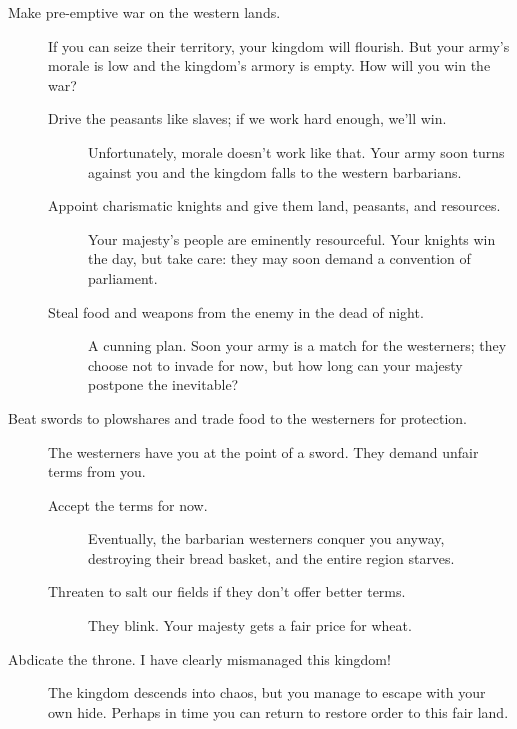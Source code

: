\documentclass{book}
\begin{document}
\begin{description}
\item[Make pre-emptive war on the western lands.]
If
you
can
seize
their
territory,
your
kingdom
will
flourish.
But
your
army's
morale
is
low
and
the
kingdom's
armory
is
empty.
How
will
you
win
the
war?
\begin{description}
\item[Drive the peasants like slaves; if we work hard enough, we'll win.]
Unfortunately,
morale
doesn't
work
like
that.
Your
army
soon
turns
against
you
and
the
kingdom
falls
to
the
western
barbarians.
\item[Appoint charismatic knights and give them land, peasants, and resources.]
Your
majesty's
people
are
eminently
resourceful.
Your
knights
win
the
day,
but
take
care:
they
may
soon
demand
a
convention
of
parliament.
\item[Steal food and weapons from the enemy in the dead of night.]
A
cunning
plan.
Soon
your
army
is
a
match
for
the
westerners;
they
choose
not
to
invade
for
now,
but
how
long
can
your
majesty
postpone
the
inevitable?
\end{description}
\item[Beat swords to plowshares and trade food to the westerners for protection.]
The
westerners
have
you
at
the
point
of
a
sword.
They
demand
unfair
terms
from
you.
\begin{description}
\item[Accept the terms for now.]
Eventually,
the
barbarian
westerners
conquer
you
anyway,
destroying
their
bread
basket,
and
the
entire
region
starves.
\item[Threaten to salt our fields if they don't offer better terms.]
They
blink.
Your
majesty
gets
a
fair
price
for
wheat.
\end{description}
\item[Abdicate the throne. I have clearly mismanaged this kingdom!]
The
kingdom
descends
into
chaos,
but
you
manage
to
escape
with
your
own
hide.
Perhaps
in
time
you
can
return
to
restore
order
to
this
fair
land.
\end{description}
\end{document}
